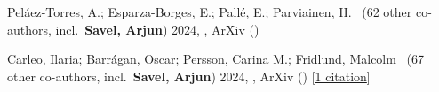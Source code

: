 \item[{\color{numcolor}\scriptsize2}] Pel{\'a}ez-Torres, A.; Esparza-Borges, E.; Pall{\'e}, E.; Parviainen, H. \etal\ ({62} other co-authors, incl.\ \textbf{Savel, Arjun}) 2024, , ArXiv ()

\item[{\color{numcolor}\scriptsize1}] Carleo, Ilaria; Barr{\'a}gan, Oscar; Persson, Carina M.; Fridlund, Malcolm \etal\ ({67} other co-authors, incl.\ \textbf{Savel, Arjun}) 2024, , ArXiv () [\href{https://ui.adsabs.harvard.edu/abs/2024arXiv240805612C}{1 citation}]